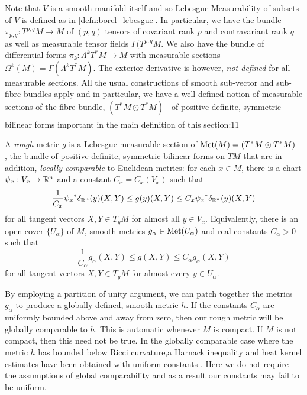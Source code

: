 \documentclass[a4paper, 12pt]{amsart}
\newcommand{\Bk}{\color{black}}
\newcommand{\Rd}{\color{red}}
\begin{document}
Note that \(V\) is a smooth manifold itself and so Lebesgue Measurability of subsets of \(V\) is defined as in \ref{defn:borel_lebesgue}. In particular, we have the bundle $\pi_{p,q} : T^{p,q}M \to M$ of $(p,q)$ tensors of covariant rank $p$ and contravariant rank $q$ as well as measurable tensor fields \(\Gamma(T^{p,q}M\). We also have the bundle of differential forms \(\pi_k : \Lambda^k T^{\ast} M \to M\) with measurable sections \(\Omega^k(M) = \Gamma(\Lambda^k T^{\ast} M)\). The exterior derivative is however, \emph{not defined} for all measurable sections. All the usual constructions of smooth sub-vector and sub-fibre bundles apply and in particular, we have a well defined notion of measurable sections of the fibre bundle, \((T^{\ast} M \odot T^{\ast} M)_+\) of positive definite, symmetric bilinear forms important in the main definition of this section:11

\begin{defn}
\label{defn:rough_metric}
A \emph{rough} metric \(g\) is a Lebesgue measurable section of \(\operatorname{Met}(M) = (T^{\ast} M \odot T^{\ast} M)_+\), the bundle of positive definite, symmetric bilinear forms on \(TM\) that are in addition, \emph{locally comparable} to Euclidean metrics:
for each $x \in M$, there is a chart $\psi_x:V_x \to \mathbb{R}^n$ and a constant $C_x = C_x(V_x)$ such that
\[
\frac{1}{C_{x}} {\psi_x}^\ast\delta_{\mathbb{R}^n}(y) (X, Y) \leq g(y)(X, Y) \leq C_{x} {\psi_x}^\ast\delta_{\mathbb{R}^n}(y) (X, Y)
\]
for all tangent vectors \(X, Y \in T_yM\) for almost all $y \in V_x$. Equivalently, there is an open cover \(\lbrace U_{\alpha} \rbrace\) of \(M\), smooth metrics \(g_{\alpha} \in \operatorname{Met}(U_{\alpha})\) and real constants \(C_{\alpha} > 0\) such that
\[
\frac{1}{C_{\alpha}} g_{\alpha} (X, Y) \leq g(X, Y) \leq C_{\alpha} g_{\alpha} (X, Y)
\]
for all tangent vectors \(X, Y \in T_yM\) for almost every $y \in U_\alpha$.
\end{defn}

\begin{rem}
By employing a partition of unity argument, we can patch together the metrics \(g_{\alpha}\) to produce a globally defined, smooth metric \(h\). If the constants \(C_{\alpha}\) are uniformly bounded above and away from zero, then our rough metric will be globally comparable to \(h\). This is automatic whenever \(M\) is compact. If \(M\) is not compact, then this need not be true. In the globally comparable case where the metric \(h\) has bounded below \Rd Ricci curvature,\Bk  a Harnack inequality and heat kernel estimates have been obtained with uniform constants \cite{SC}. Here we do not require the assumptions of global comparability and as a result our constants may fail to be uniform.
\end{rem}
\end{document}
